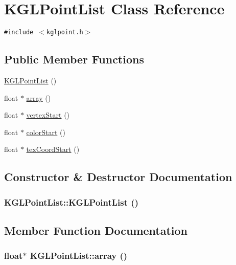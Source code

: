 \hypertarget{class_k_g_l_point_list}{
\section{KGLPointList Class Reference}
\label{class_k_g_l_point_list}
}
{\tt \#include $<$kglpoint.h$>$}

\subsection*{Public Member Functions}
\begin{CompactItemize}
\item 
\hyperlink{class_k_g_l_point_list_c714e47e8f2b86382ecc248b2d7b94b2}{KGLPointList} ()
\item 
float $\ast$ \hyperlink{class_k_g_l_point_list_3ad82d96624e2dc59dbb3d8688d50209}{array} ()
\item 
float $\ast$ \hyperlink{class_k_g_l_point_list_66f55a46c09cc9062c5a62279a936a09}{vertexStart} ()
\item 
float $\ast$ \hyperlink{class_k_g_l_point_list_68ee14e7429f2390b8dd7dbb3492dec3}{colorStart} ()
\item 
float $\ast$ \hyperlink{class_k_g_l_point_list_173fb946e98e011a010eecaf8fb10dbf}{texCoordStart} ()
\end{CompactItemize}


\subsection{Constructor \& Destructor Documentation}
\hypertarget{class_k_g_l_point_list_c714e47e8f2b86382ecc248b2d7b94b2}{
\subsubsection[{KGLPointList}]{\setlength{\rightskip}{0pt plus 5cm}KGLPointList::KGLPointList ()}}
\label{class_k_g_l_point_list_c714e47e8f2b86382ecc248b2d7b94b2}




\subsection{Member Function Documentation}
\hypertarget{class_k_g_l_point_list_3ad82d96624e2dc59dbb3d8688d50209}{
\subsubsection[{array}]{\setlength{\rightskip}{0pt plus 5cm}float$\ast$ KGLPointList::array ()}}
\label{class_k_g_l_point_list_3ad82d96624e2dc59dbb3d8688d50209}


